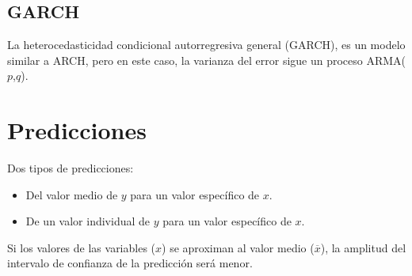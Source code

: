 \documentclass[10pt, a4paper, landscape]{extarticle}
\begin{document}
\begin{multicols}{3}
	\subsection*{GARCH}
		La heterocedasticidad condicional autorregresiva general (GARCH), es un modelo similar a ARCH, pero en este caso, la varianza del error sigue un proceso ARMA($p$,$q$).

\section*{Predicciones}
	Dos tipos de predicciones:
	\begin{itemize}[leftmargin=*]
		\item Del valor medio de $y$ para un valor específico de $x$.
		\item De un valor individual de $y$ para un valor específico de $x$.
	\end{itemize}
	Si los valores de las variables ($x$) se aproximan al valor medio ($\overline{x}$), la amplitud del intervalo de confianza de la predicción será menor.
\end{multicols}
\end{document}
